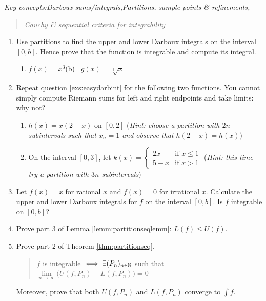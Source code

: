 \begin{exercises}
	\emph{Key concepts:\quad Darboux sums/integrals,\qquad Partitions, sample points \& refinements,}
	\begin{quote}
		\emph{Cauchy \& sequential criteria for integrability}
	\end{quote}
	
	\begin{enumerate}
		\item\label{exs:easydarbint} Use partitions to find the upper and lower Darboux integrals on the interval $[0,b]$. Hence prove that the function is integrable and compute its integral.
		\begin{enumerate}
		  \item $f(x)=x^3$\qquad\qquad\qquad (b) \ $g(x)=\sqrt[3]{x}$%
		\end{enumerate}
		
		
		\item Repeat question \ref*{exs:easydarbint} for the following two functions. You cannot simply compute Riemann sums for left and right endpoints and take limits: why not?
		\begin{enumerate}  
		  \item $h(x)=x(2-x)$ on $[0,2]$\smallbreak
		  (\emph{Hint: choose a partition with $2n$ subintervals such that $x_n=1$ and observe that $h(2-x)=h(x)$})
		  
		  \item On the interval $[0,3]$, let $k(x)=\begin{cases}
		  2x&\text{if }x\le 1\\
		 	5-x&\text{if }x>1
		  \end{cases}$\smallbreak
		  (\emph{Hint: this time try a partition with $3n$ subintervals})
		\end{enumerate}
	
	
	  \item Let $f(x)=x$ for rational $x$ and $f(x)=0$ for irrational $x$. Calculate the upper and lower Darboux integrals for $f$ on the interval $[0,b]$. Is $f$ integrable on $[0,b]$?
	
	    
		\item Prove part 3 of Lemma \ref{lemm:partitionseqlemm}: $L(f)\le U(f)$.
	
	
		\item Prove part 2 of Theorem \ref{thm:partitionseq}.
	 	\begin{quote}
	 		$f$ is integrable $\iff\exists (P_n)_{n\in\mathbb{N}}$ such that $\lim\limits_{n\to\infty}\bigl(U(f,P_n)-L(f,P_n)\bigr) =0$
	 	\end{quote}
	 	Moreover, prove that both $U(f,P_n)$ and $L(f,P_n)$ converge to $\int f$.
		

\end{enumerate}
\end{exercises}
